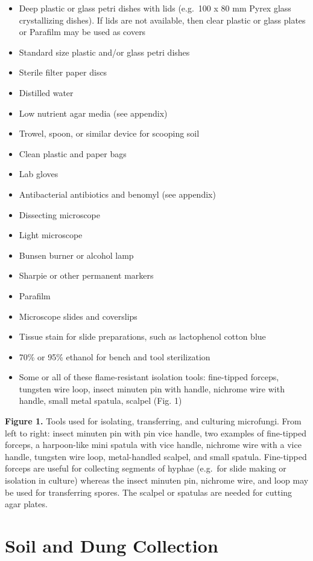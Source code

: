 \documentclass[]{book}
\providecommand{\tightlist}{%
  \setlength{\itemsep}{0pt}\setlength{\parskip}{0pt}}
\begin{document}
\begin{itemize}
\tightlist
\item
  Deep plastic or glass petri dishes with lids (e.g.~100 x 80 mm Pyrex
  glass crystallizing dishes). If lids are not available, then clear
  plastic or glass plates or Parafilm may be used as covers
\item
  Standard size plastic and/or glass petri dishes
\item
  Sterile filter paper discs
\item
  Distilled water
\item
  Low nutrient agar media (see appendix)
\item
  Trowel, spoon, or similar device for scooping soil
\item
  Clean plastic and paper bags
\item
  Lab gloves
\item
  Antibacterial antibiotics and benomyl (see appendix)
\item
  Dissecting microscope
\item
  Light microscope
\item
  Bunsen burner or alcohol lamp
\item
  Sharpie or other permanent markers
\item
  Parafilm
\item
  Microscope slides and coverslips
\item
  Tissue stain for slide preparations, such as lactophenol cotton blue
\item
  70\% or 95\% ethanol for bench and tool sterilization
\item
  Some or all of these flame-resistant isolation tools: fine-tipped
  forceps, tungsten wire loop, insect minuten pin with handle, nichrome
  wire with handle, small metal spatula, scalpel (Fig. 1)
\end{itemize}

\textbf{Figure 1.} Tools used for isolating, transferring, and culturing
microfungi. From left to right: insect minuten pin with pin vice handle,
two examples of fine-tipped forceps, a harpoon-like mini spatula with
vice handle, nichrome wire with a vice handle, tungsten wire loop,
metal-handled scalpel, and small spatula. Fine-tipped forceps are useful
for collecting segments of hyphae (e.g.~for slide making or isolation in
culture) whereas the insect minuten pin, nichrome wire, and loop may be
used for transferring spores. The scalpel or spatulas are needed for
cutting agar plates.

\section{Soil and Dung Collection}\label{soil-and-dung-collection}
\end{document}
